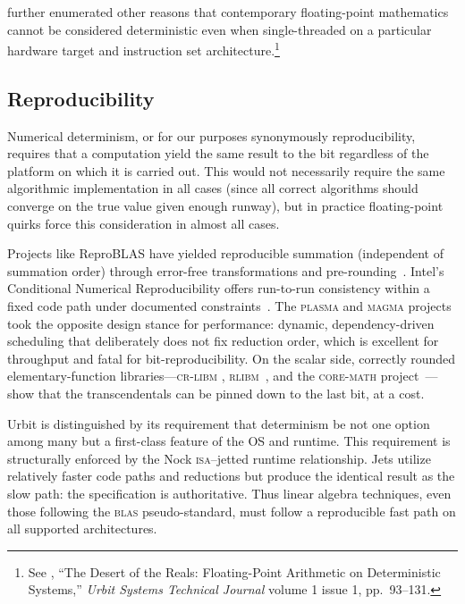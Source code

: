 \documentclass[twoside]{article}
\begin{document}
\noindent
\citeauthor{Davis2024} further enumerated other reasons that contemporary floating-point mathematics cannot be considered deterministic even when single-threaded on a particular hardware target and instruction set architecture.\footnote{See , ``The Desert of the Reals:  Floating-Point Arithmetic on Deterministic Systems,'' \emph{Urbit Systems Technical Journal} volume 1 issue 1, pp.~93--131.}

\subsection{Reproducibility}

Numerical determinism, or for our purposes synonymously reproducibility, requires that a computation yield the same result to the bit regardless of the platform on which it is carried out.  This would not necessarily require the same algorithmic implementation in all cases (since all correct algorithms should converge on the true value given enough runway), but in practice floating-point quirks force this consideration in almost all cases.

Projects like ReproBLAS have yielded reproducible summation (independent of summation order) through
error-free transformations and pre-rounding~\citep{demmel2013reproducible}.  Intel's Conditional Numerical Reproducibility offers run-to-run consistency within a fixed code path under documented constraints~\citep{intel_cnr}.  The \textsc{plasma} and \textsc{magma} pro\-jects \citep{agullo2009plasma} took the opposite design stance for performance: dynamic, dependency-driven scheduling that deliberately does not fix reduction order, which is excellent for throughput and fatal for bit-reproducibility.  On the scalar side, correctly rounded elementary-function libraries---\textsc{cr-libm} \linebreak\citep{daramy2003crlibm}, \textsc{rlibm}~\citep{lim2021rlibm}, and the \textsc{core-math} project~\citep{coremath}---show that the transcendentals can be pinned down to the last bit, at a cost.

Urbit is distinguished by its requirement that determinism be not one option among many but a first-class feature of the OS and runtime.  This requirement is structurally enforced by the Nock \textsc{isa}--jetted runtime relationship.  Jets utilize relatively faster code paths and reductions but produce the identical result as the slow path:  the specification is authoritative.  Thus linear algebra techniques, even those following the \textsc{blas} pseudo-standard, must follow a reproducible fast path on all supported architectures.
\end{document}
